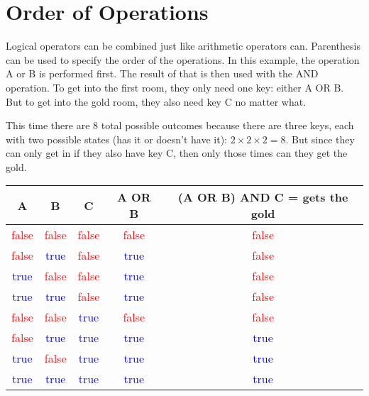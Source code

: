 \section{Order of Operations}

Logical operators can be combined just like arithmetic operators can. Parenthesis can be used to specify the order of the operations. In this example, the operation A or B is performed first. The result of that is then used with the AND operation. To get into the first room, they only need one key: either A OR B. But to get into the gold room, they also need key C no matter what.\\

\begin{center} \end{center}

This time there are 8 total possible outcomes because there are three keys, each with two possible states (has it or doesn't have it): \(2 \times 2 \times 2 = 8 \). But since they can only get in if they also have key C, then only those times can they get the gold.

\begin{center}
	\begin{tabular}{c | c | c | c | c}
		A & B & C & A OR B & (A OR B) AND C = gets the gold\\ \hline
		\textcolor{red}{false} & \textcolor{red}{false} & \textcolor{red}{false} & \textcolor{red}{false} & \textcolor{red}{false}\\ \hline
		\textcolor{red}{false} & \textcolor{blue}{true} & \textcolor{red}{false} & \textcolor{blue}{true} & \textcolor{red}{false}\\ \hline
		\textcolor{blue}{true} & \textcolor{red}{false} & \textcolor{red}{false} & \textcolor{blue}{true} & \textcolor{red}{false}\\ \hline
		\textcolor{blue}{true} & \textcolor{blue}{true} & \textcolor{red}{false} & \textcolor{blue}{true} & \textcolor{red}{false}\\ \hline

		\textcolor{red}{false} & \textcolor{red}{false} & \textcolor{blue}{true} & \textcolor{red}{false} & \textcolor{red}{false}\\ \hline
		\textcolor{red}{false} & \textcolor{blue}{true} & \textcolor{blue}{true} & \textcolor{blue}{true} & \textcolor{blue}{true}\\ \hline
		\textcolor{blue}{true} & \textcolor{red}{false} & \textcolor{blue}{true} & \textcolor{blue}{true} & \textcolor{blue}{true}\\ \hline
		\textcolor{blue}{true} & \textcolor{blue}{true} & \textcolor{blue}{true} & \textcolor{blue}{true} & \textcolor{blue}{true}\\ \hline
	\end{tabular}
\end{center}

